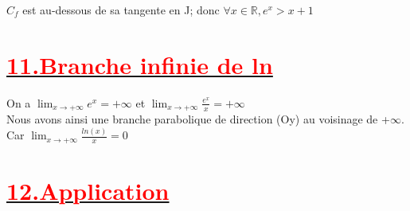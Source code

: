 \documentclass[12pt]{article}
\begin{document}

$C_{f}$ est au-dessous de sa tangente en J; donc $\forall x \in \mathbb{R}, e^{x}>x+1$
\section*{\underline{\textbf{\textcolor{red}{11.Branche infinie de ln}}}}
On a  $\lim_{{x \to +\infty}} e^{x}=+\infty$ et $\lim_{{x \to +\infty}} \frac{e^{x}}{x}=+\infty$\\
Nous avons ainsi une branche parabolique de direction (Oy) au voisinage de +$\infty$.\\
Car $\lim_{{x \to +\infty}} \frac{ln(x)}{x}=0$\\
\section*{\underline{\textbf{\textcolor{red}{12.Application}}}}
\end{document}
